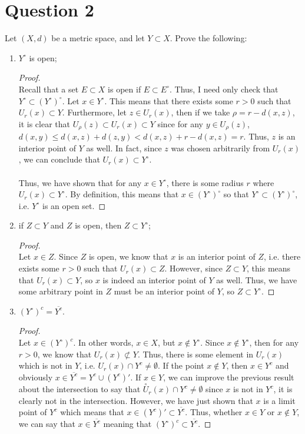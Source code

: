 \documentclass[10pt,a4paper]{article}
\theoremstyle{definition}
\theoremstyle{definition}
\begin{document}
\section*{Question 2}
Let $(X, d)$ be a metric space, and let $Y \subset X$. Prove the following:
\begin{enumerate}[label = (\alph*)]
\item $Y^\circ$ is open;
	\begin{proof}$ $
	\\Recall that a set $E \subset X$ is open if $E \subset E^\circ$. Thus, I need only check that $Y^\circ \subset (Y^\circ)^\circ$. Let $x \in Y^\circ$. This means that there exists some $r > 0$ such that $U_r(x) \subset Y$. Furthermore, let $z \in U_r(x)$, then if we take $\rho = r - d(x, z)$, it is clear that $U_\rho(z) \subset U_r(x) \subset Y$ since for any $y \in U_\rho(z)$, $d(x, y) \leq d(x, z) + d(z, y) < d(x, z) + r - d(x, z) = r$. Thus, $z$ is an interior point of $Y$ as well. In fact, since $z$ was chosen arbitrarily from $U_r(x)$, we can conclude that $U_r(x) \subset Y^\circ$. 
	\\
	\\Thus, we have shown that for any $x \in Y^\circ$, there is some radius $r$ where $U_r(x) \subset Y^\circ$. By definition, this means that $x \in (Y^\circ)^\circ$ so that $Y^\circ \subset (Y^\circ)^\circ$, i.e. $Y^\circ$ is an open set. 
	\end{proof}
\item if $Z \subset Y$ and $Z$ is open, then $Z \subset Y^\circ$;
	\begin{proof}$ $
	\\Let $x \in Z$. Since $Z$ is open, we know that $x$ is an interior point of $Z$, i.e. there exists some $r > 0$ such that $U_r(x) \subset Z$. However, since $Z \subset Y$, this means that $U_r(x) \subset Y$, so $x$ is indeed an interior point of $Y$ as well. Thus, we have some arbitrary point in $Z$ must be an interior point of $Y$, so $Z \subset Y^\circ$. 
	\end{proof}
\item $(Y^\circ)^c = \overline{Y^c}$.
	\begin{proof}$ $
	\\Let $x \in (Y^\circ)^c$. In other words, $x \in X$, but $x \not \in Y^\circ$. Since $x \not \in Y^\circ$, then for any $r > 0$, we know that $U_r(x) \not \subset Y$. Thus, there is some element in $U_r(x)$ which is not in $Y$, i.e. $U_r(x) \cap Y^c \neq \emptyset$. If the point $x \not \in Y$, then $x \in Y^c$ and obviously $x \in \overline{Y^c} = Y^c \cup (Y^c)'$. If $x \in Y$, we can improve the previous result about the intersection to say that $\stackrel{\circ}{U}_r(x) \cap Y^c \neq \emptyset$ since $x$ is not in $Y^c$, it is clearly not in the intersection. However, we have just shown that $x$ is a limit point of $Y^c$ which means that $x \in (Y^c)' \subset \overline{Y^c}$. Thus, whether $x \in Y$ or $x \not \in Y$, we can say that $x \in \overline{Y^c}$ meaning that $(Y^\circ)^c \subset \overline{Y^c}$.

\end{proof}
\end{enumerate}
\end{document}
